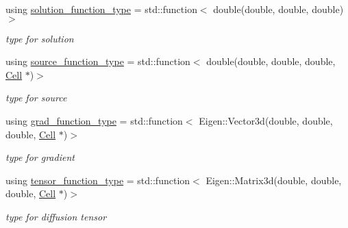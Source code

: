 \begin{DoxyCompactItemize}
\item 
\mbox{\label{classHArDCore3D_1_1HHO__LocVarDiff_a57cf83c67a9bcd71822a4ebdfbe0f0ce}} 
using \hyperlink{classHArDCore3D_1_1HHO__LocVarDiff_a57cf83c67a9bcd71822a4ebdfbe0f0ce}{solution\+\_\+function\+\_\+type} = std\+::function$<$ double(double, double, double)$>$
\begin{DoxyCompactList}\small\item\em type for solution \end{DoxyCompactList}\item 
\mbox{\label{classHArDCore3D_1_1HHO__LocVarDiff_a478a09a65f66428a614412e7d308ffcd}} 
using \hyperlink{classHArDCore3D_1_1HHO__LocVarDiff_a478a09a65f66428a614412e7d308ffcd}{source\+\_\+function\+\_\+type} = std\+::function$<$ double(double, double, double, \hyperlink{classHArDCore3D_1_1Cell}{Cell} $\ast$)$>$
\begin{DoxyCompactList}\small\item\em type for source \end{DoxyCompactList}\item 
\mbox{\label{classHArDCore3D_1_1HHO__LocVarDiff_a13003c1e92aab2a21e3055e2fd7104f8}} 
using \hyperlink{classHArDCore3D_1_1HHO__LocVarDiff_a13003c1e92aab2a21e3055e2fd7104f8}{grad\+\_\+function\+\_\+type} = std\+::function$<$ Eigen\+::\+Vector3d(double, double, double, \hyperlink{classHArDCore3D_1_1Cell}{Cell} $\ast$)$>$
\begin{DoxyCompactList}\small\item\em type for gradient \end{DoxyCompactList}\item 
\mbox{\label{classHArDCore3D_1_1HHO__LocVarDiff_aba48f23cd9e46ab3b0d7d907e0990bd6}} 
using \hyperlink{classHArDCore3D_1_1HHO__LocVarDiff_aba48f23cd9e46ab3b0d7d907e0990bd6}{tensor\+\_\+function\+\_\+type} = std\+::function$<$ Eigen\+::\+Matrix3d(double, double, double, \hyperlink{classHArDCore3D_1_1Cell}{Cell} $\ast$)$>$
\begin{DoxyCompactList}\small\item\em type for diffusion tensor \end{DoxyCompactList}\end{DoxyCompactItemize}
